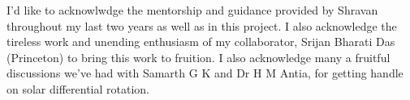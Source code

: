 
\begin{acknowledgements}      

I'd like to acknowlwdge the mentorship and guidance provided by Shravan throughout my last two years as well as in this project. I also acknowledge the tireless work and unending enthusiasm of my collaborator, Srijan Bharati Das (Princeton) to bring this work to fruition. I also acknowledge many a fruitful discussions we've had with Samarth G K and Dr H M Antia, for getting handle on solar differential rotation.
\end{acknowledgements}
